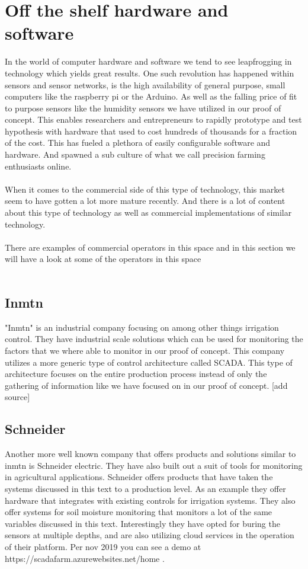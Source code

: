 \documentclass[]{uiophd}
\begin{document}
\section{Off the shelf hardware and software}
In the world of computer hardware and software we tend to see leapfrogging in technology which yields great results. One such revolution has happened within sensors and sensor networks, is the high availability of general purpose, small computers like the raspberry pi or the Arduino. As well as the falling price of fit to purpose sensors like the humidity sensors we have utilized in our proof of concept. This enables researchers and entrepreneurs to rapidly prototype and test hypothesis with hardware that used to cost hundreds of thousands for a fraction of the cost. This has fueled a plethora of easily configurable software and hardware. And spawned a sub culture of what we call precision farming enthusiasts online. 
\\\\
When it comes to the commercial side of this type of technology, this market seem to have gotten a lot more mature recently. And there is a lot of content about this type of technology as well as commercial implementations of similar technology.
\\\\
There are examples of commercial operators in this space and in this section we will have a look at some of the operators in this space
\\\\
\subsection{Inmtn}
"Inmtn" is an industrial company focusing on among other things irrigation control. They have industrial scale solutions which can be used for monitoring the factors that we where able to monitor in our proof of concept. This company utilizes a more generic type of control architecture called SCADA. This type of architecture focuses on the entire production process instead of only the gathering of information like we have focused on in our proof of concept. [add source]

\subsection{Schneider}
Another more well known company that offers products and solutions similar to inmtn is Schneider electric. They have also built out a suit of tools for monitoring in agricultural applications. Schneider offers products that have taken the systems discussed in this text to a production level. As an example they offer hardware that integrates with existing controls for irrigation systems. They also offer systems for soil moisture monitoring that monitors a lot of the same variables discussed in this text. Interestingly they have opted for buring the sensors at multiple depths, and are also utilizing cloud services in the operation of their platform. Per nov 2019 you can see a demo at https://scadafarm.azurewebsites.net/home . 
\end{document}
